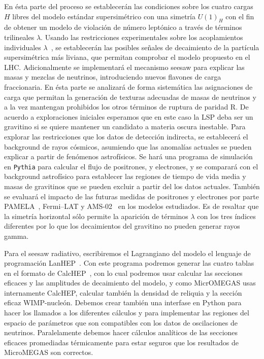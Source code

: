 \begin{itemize}
\begin{proyecto}
  En ésta parte del proceso se establecerán las condiciones sobre los
  cuatro cargas $H$ libres del modelo estándar supersimétrico con una
  simetría $U(1)_H$ con el fin de obtener un modelo de violación de
  número leptónico a través de términos trilineales $\lambda$. Usando
  las restricciones experimentales sobre los acoplamientos
  individuales $\lambda$~\cite{Barbier:2004ez}, se establecerán las
  posibles señales de decaimiento de la partícula supersimétrica más
  liviana, que permitan comprobar el modelo propuesto en el
  LHC. Adicionalmente se implementará el mecanismo seesaw para
  explicar las masas y mezclas de neutrinos, introduciendo nuevos
  flavones de carga fraccionaria.  En ésta parte se analizará de forma
  sistemática las asignaciones de carga que permitan la generación de
  texturas adecuadas de masas de neutrinos y a la vez mantengan
  prohibidos los otros términos de ruptura de paridad R. De acuerdo a
  exploraciones iniciales esperamos que en este caso la LSP deba ser
  un gravitino si se quiere mantener un candidato a materia oscura
  inestable. Para explorar las restricciones que los datos de
  detección indirecta, se establecerá el background de rayos cósmicos,
  asumiendo que las anomalías actuales se pueden explicar a partir de
  fenómenos astrofísicos. Se hará una programa de simulación en
  \texttt{Pythia} \cite{Sjostrand:2006za} para calcular el flujo de
  positrones, y electrones, y se comparará con el background
  astrofísico para establecer las regiones de tiempo de vida media y
  masas de gravitinos que se pueden excluir a partir del los datos
  actuales. También se evaluará el impacto de las futuras medidas de
  positrones y electrones por parte PAMELA~\cite{Adriani:2008zr},
  Fermi--LAT\cite{Abdo:2009zk} y AMS-02~\cite{ams:2009} en los modelos
  estudiados. Es de resaltar que la simetría horizontal sólo permite
  la aparición de términos $\lambda$ con los tres índices diferentes
  por lo que los decaimientos del gravitino no pueden generar rayos
  gamma.
\end{proyecto}

\begin{darkmatter}
\begin{proyecto}
  Para el seesaw radiativo, escribiremos el Lagrangiano del modelo el
  lenguaje de programación LanHEP~\cite{Semenov:2008jy}. Con este programa
  podremos generar las cuatro tablas en el formato de
  CalcHEP~\cite{Pukhov:2004ca}, con lo cual podremos usar calcular
  las secciones eficaces y las amplitudes de decaimiento del modelo, y
  como MicrOMEGAS usas internamente CalcHEP, calcular también la
  densidad de reliquia y la sección eficaz WIMP-nucleón. Debemos crear
  también una interfase en Python para hacer los llamados a los
  diferentes cálculos y para implementar las regiones del espacio de
  parámetros que son compatibles con los datos de oscilaciones de
  neutrinos. Paralelamente debemos hacer cálculos analíticos de las
  secciones eficaces promediadas térmicamente para estar seguros que
  los resultados de MicroMEGAS son correctos.
\end{proyecto}
\end{darkmatter}



\end{itemize}
